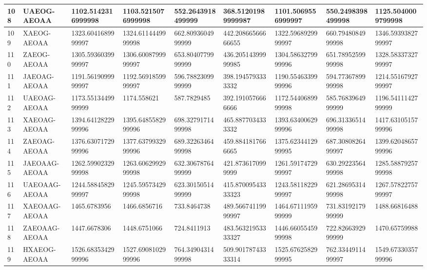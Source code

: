 {\begin{longtable}{|l|l|l|l|l|l|l|l|l|}
        108 & UAEOG-AEOAA & 1102.5142316999998 & 1103.5215076999998 & 552.2643918499999 & 368.51201989999987 & 1101.5069556999997 & 550.2498398499998 & 1125.5040009799998 \\ \hline
        109 & XAEOG-AEOAA & 1323.6041689999997 & 1324.6114449999998 & 662.8093604999999 & 442.20866566666655 & 1322.5968929999997 & 660.7948084999998 & 1346.5939382799997 \\ \hline
        110 & ZAEOG-AEOAA & 1305.5936039999997 & 1306.6008799999997 & 653.8040779999999 & 436.20514399999985 & 1304.5863279999996 & 651.7895259999998 & 1328.5833732799997 \\ \hline
        111 & JAEOAG-AEOAA & 1191.5619099999997 & 1192.5691859999997 & 596.7882309999999 & 398.1945793333332 & 1190.5546339999996 & 594.7736789999998 & 1214.5516792799997 \\ \hline
        112 & UAEOAG-AEOAA & 1173.5513449999999 & 1174.558621 & 587.7829485 & 392.1910576666666 & 1172.5440689999998 & 585.7683964999999 & 1196.5411142799999 \\ \hline
        113 & XAEOAG-AEOAA & 1394.6412822999996 & 1395.6485582999996 & 698.3279171499998 & 465.8877034333332 & 1393.6340062999996 & 696.3133651499998 & 1417.6310515799996 \\ \hline
        114 & ZAEOAG-AEOAA & 1376.6307172999996 & 1377.6379932999996 & 689.3226346499998 & 459.8841817666665 & 1375.6234412999995 & 687.3080826499997 & 1399.6204865799996 \\ \hline
        115 & JAEOAAG-AEOAA & 1262.5990232999998 & 1263.6062992999998 & 632.3067876499999 & 421.8736170999999 & 1261.5917472999997 & 630.2922356499998 & 1285.5887925799998 \\ \hline
        116 & UAEOAAG-AEOAA & 1244.5884582999997 & 1245.5957342999998 & 623.3015051499999 & 415.87009543333323 & 1243.5811822999997 & 621.2869531499998 & 1267.5782275799997 \\ \hline
        117 & XAEOAAG-AEOAA & 1465.6783956 & 1466.6856716 & 733.8464738 & 489.56674119999997 & 1464.6711195999999 & 731.8319217999999 & 1488.66816488 \\ \hline
        118 & ZAEOAAG-AEOAA & 1447.6678306 & 1448.6751066 & 724.8411913 & 483.56321953333327 & 1446.6605545999998 & 722.8266392999999 & 1470.65759988 \\ \hline
        119 & HXAEOG-AEOAA & 1526.6835342999996 & 1527.6908102999996 & 764.3490431499998 & 509.90178743333314 & 1525.6762582999995 & 762.3344911499997 & 1549.6733035799996 \\ \hline

\end{longtable}}
